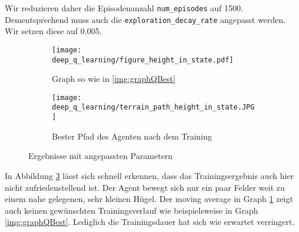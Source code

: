 Wir reduzieren daher die Episodenanzahl \texttt{num_episodes} auf 1500. Dementsprechend muss auch die \texttt{exploration_decay_rate} angepasst werden. Wir setzen diese auf 0.005.
\begin{figure}[h!]
    \centering
    \begin{subfigure}[b]{0.49\textwidth}
        \texttt{[image: deep\_q\_learning/figure\_height\_in\_state.pdf]}
        \caption{Graph so wie in \ref{img:graphQBest}}
        \label{img:graphDeepQHeightInState}
    \end{subfigure}
    \begin{subfigure}[b]{0.49\textwidth}
        \texttt{[image: deep\_q\_learning/terrain\_path\_height\_in\_state.JPG]}
        \caption{Bester Pfad des Agenten nach dem Training}
        \label{img:pathDeepQHeightInState}
    \end{subfigure}
    \caption{Ergebnisse mit angepassten Parametern}
\end{figure}
In Abbildung \ref{img:pathDeepQHeightInState} lässt sich schnell erkennen, dass das Trainingsergebnis auch hier nicht zufriedenstellend ist. Der Agent bewegt sich nur ein paar Felder weit zu einem nahe gelegenen, sehr kleinen Hügel. Der moving average in Graph \ref{img:graphDeepQHeightInState} zeigt auch keinen gewünschten Trainingsverlauf wie beispielsweise in Graph \ref{img:graphQBest}. Lediglich die Trainingsdauer hat sich wie erwartet verringert.

